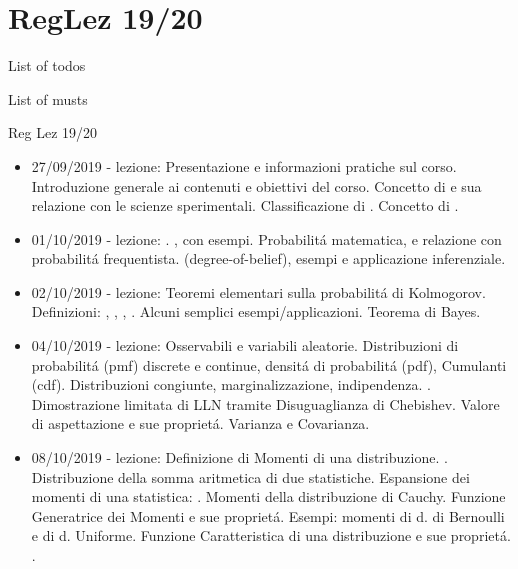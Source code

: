 \documentclass[asd-beamer.tex]{subfiles}
\begin{document}
\section{RegLez 19/20}

\begin{frame}[allowframebreaks]{List of todos}
\listoftodos
\end{frame}

\begin{frame}[allowframebreaks]{List of musts}
\listofmusts
\end{frame}

\begin{frame}[allowframebreaks]{Reg Lez 19/20}
\begin{itemize}
\item 27/09/2019 - lezione: Presentazione e informazioni pratiche sul corso. Introduzione generale ai contenuti e obiettivi del corso. Concetto di  e sua relazione con le scienze sperimentali. Classificazione di . Concetto di .
\item 01/10/2019 - lezione: . , con esempi. Probabilit\'a matematica,  e relazione con probabilit\'a frequentista.  (degree-of-belief), esempi e applicazione inferenziale.
\item 02/10/2019 - lezione: Teoremi elementari sulla probabilit\'a di Kolmogorov. Definizioni: , , , . Alcuni semplici esempi/applicazioni. Teorema di Bayes.
\item 04/10/2019 - lezione: Osservabili e variabili aleatorie. Distribuzioni di probabilit\'a (pmf) discrete e continue, densit\'a di probabilit\'a (pdf), Cumulanti (cdf). Distribuzioni congiunte, marginalizzazione, indipendenza. . Dimostrazione limitata di LLN tramite Disuguaglianza di Chebishev. Valore di aspettazione e sue propriet\'a. Varianza e Covarianza.
\item 08/10/2019 - lezione: Definizione di Momenti di una distribuzione. . Distribuzione della somma aritmetica di due statistiche. Espansione dei momenti di una statistica: . Momenti della distribuzione di Cauchy. Funzione Generatrice dei Momenti e sue propriet\'a. Esempi: momenti di d. di Bernoulli e di d. Uniforme. Funzione Caratteristica di una distribuzione e sue propriet\'a. .

\end{itemize}
\end{frame}
\end{document}
